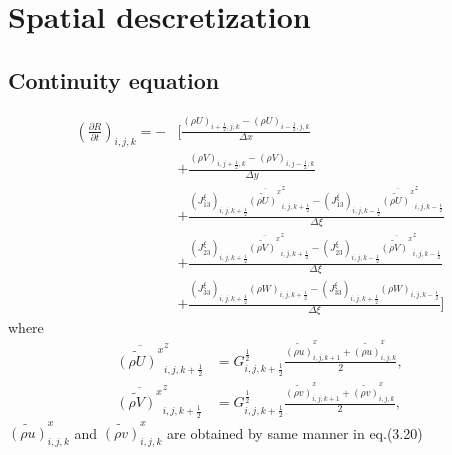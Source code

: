 \section{Spatial descretization}
\subsection{Continuity equation}
\begin{align}
 \left(\frac{\partial R}{\partial t}\right)_{i,j,k}
 = - &\Bigg[ \frac{ (\rho U)_{i+\frac{1}{2},j,k}
                  - (\rho U)_{i-\frac{1}{2},j,k}
                  } {\Delta x} \nonumber \\
          &+ \frac{ (\rho V)_{i,j+\frac{1}{2},k}
                  - (\rho V)_{i,j-\frac{1}{2},k}
                  } {\Delta y} \nonumber \\
          &+ \frac{ (J^{\xi}_{13})_{i,j,k+\frac{1}{2}} \overline{\widetilde{(\rho U)}^x}^z_{i,j,k+\frac{1}{2}}
                  - (J^{\xi}_{13})_{i,j,k-\frac{1}{2}} \overline{\widetilde{(\rho U)}^x}^z_{i,j,k-\frac{1}{2}}
                  } {\Delta \xi} \nonumber \\
          &+ \frac{ (J^{\xi}_{23})_{i,j,k+\frac{1}{2}} \overline{\widetilde{(\rho V)}^x}^z_{i,j,k+\frac{1}{2}}
                  - (J^{\xi}_{23})_{i,j,k-\frac{1}{2}} \overline{\widetilde{(\rho V)}^x}^z_{i,j,k-\frac{1}{2}}
                  } {\Delta \xi} \nonumber \\
          &+ \frac{ (J^{\xi}_{33})_{i,j,k+\frac{1}{2}} (\rho W)_{i,j,k+\frac{1}{2}}
                  - (J^{\xi}_{33})_{i,j,k+\frac{1}{2}} (\rho W)_{i,j,k-\frac{1}{2}}
                  } {\Delta \xi} \Bigg]
\end{align}
where
\begin{align}
 \overline{\widetilde{(\rho U)}^x}^z_{i,j,k+\frac{1}{2}}
 &= G^{\frac{1}{2}}_{i,j,k+\frac{1}{2}} \frac{ \widetilde{(\rho u)}^x_{i,j,k+1}
                                             + \widetilde{(\rho u)}^x_{i,j,k  }
                                             } {2}, \\
 \overline{\widetilde{(\rho V)}^x}^z_{i,j,k+\frac{1}{2}}
 &= G^{\frac{1}{2}}_{i,j,k+\frac{1}{2}} \frac{ \widetilde{(\rho v)}^x_{i,j,k+1}
                                             + \widetilde{(\rho v)}^x_{i,j,k  }
                                             } {2},
\end{align}
$\widetilde{(\rho u)}^x_{i,j,k}$ and $\widetilde{(\rho v)}^x_{i,j,k}$ are obtained by same manner in eq.(3.20)

